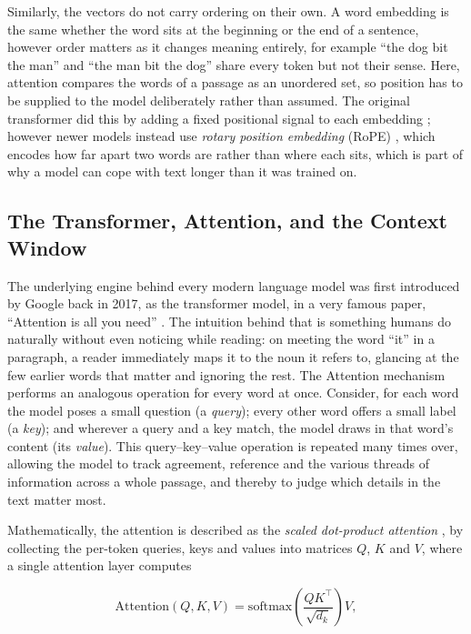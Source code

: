 Similarly, the vectors do not carry ordering on their own. A word embedding is the same whether the word sits at the beginning or the end of a sentence, however order matters as it changes meaning entirely, for example ``the dog bit the man'' and ``the man bit the dog'' share every token but not their sense. Here, attention compares the words of a passage as an unordered set, so position has to be supplied to the model deliberately rather than assumed. The original transformer did this by adding a fixed positional signal to each embedding \cite{vaswani2023attentionneed}; however newer models instead use \emph{rotary position embedding} (RoPE) \cite{su2023roformerenhancedtransformerrotary}, which encodes how far apart two words are rather than where each sits, which is part of why a model can cope with text longer than it was trained on.



\subsection{The Transformer, Attention, and the Context Window}
\label{subsec:transformer-attention}

The underlying engine behind every modern language model was first introduced by Google back in 2017, as the transformer model, in a very famous paper, ``Attention is all you need'' \cite{vaswani2023attentionneed}. The intuition behind that is something humans do naturally without even noticing while reading: on meeting the word ``it'' in a paragraph, a reader immediately maps it to the noun it refers to, glancing at the few earlier words that matter and ignoring the rest. The Attention mechanism performs an analogous operation for every word at once. Consider, for each word the model poses a small question (a \emph{query}); every other word offers a small label (a \emph{key}); and wherever a query and a key match, the model draws in that word's content (its \emph{value}). This query--key--value operation is repeated many times over, allowing the model to track agreement, reference and the various threads of information across a whole passage, and thereby to judge which details in the text matter most.

Mathematically, the attention is described as the \emph{scaled dot-product attention}
\cite{vaswani2023attentionneed}, by collecting the per-token queries, keys and values into matrices $Q$, $K$ and $V$, where a single attention layer computes

\begin{equation}\label{eq:attention}
  \mathrm{Attention}(Q,K,V) = \mathrm{softmax}\!\left(\frac{QK^{\top}}{\sqrt{d_k}}\right)V ,
\end{equation}

